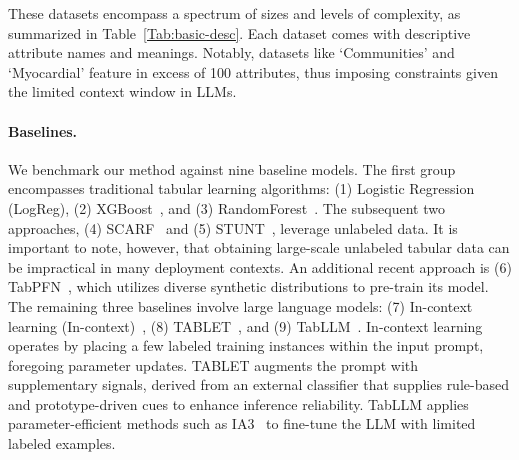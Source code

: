 These datasets encompass a spectrum of sizes and levels of complexity, as summarized in Table~\ref{Tab:basic-desc}. Each dataset comes with descriptive attribute names and meanings. Notably, datasets like `Communities' and `Myocardial' feature in excess of 100 attributes, thus imposing constraints given the limited context window in LLMs.

\vspace*{-0.12in}
\paragraph{Baselines.}
We benchmark our method against nine baseline models. The first group encompasses traditional tabular learning algorithms: (1) Logistic Regression (LogReg), (2) XGBoost~\cite{chen2016xgboost}, and (3) RandomForest~\cite{ho1995random}. The subsequent two approaches, (4) SCARF~\cite{bahri2022scarf} and (5) STUNT~\cite{nam2023stunt}, leverage unlabeled data. It is important to note, however, that obtaining large-scale unlabeled tabular data can be impractical in many deployment contexts. An additional recent approach is (6) TabPFN~\cite{hollmann2022tabpfn}, which utilizes diverse synthetic distributions to pre-train its model. The remaining three baselines involve large language models: (7) In-context learning (In-context)~\cite{wei2022emergent}, (8) TABLET~\cite{slack2023tablet}, and (9) TabLLM~\cite{hegselmann2023tabllm}. In-context learning operates by placing a few labeled training instances within the input prompt, foregoing parameter updates. TABLET augments the prompt with supplementary signals, derived from an external classifier that supplies rule-based and prototype-driven cues to enhance inference reliability. TabLLM applies parameter-efficient methods such as IA3~\cite{liu2022few} to fine-tune the LLM with limited labeled examples.

\vspace*{-0.12in}
